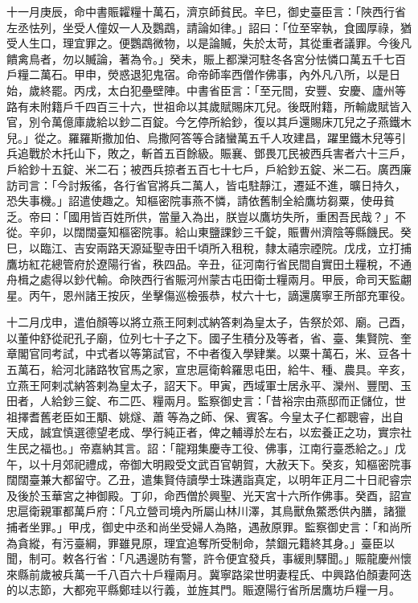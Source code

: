 \begin{pinyinscope}
 十一月庚辰，命中書賑糶糧十萬石，濟京師貧民。辛巳，御史臺臣言：「陜西行省左丞怯列，坐受人僮奴一人及鸚鵡，請論如律。」詔曰：「位至宰執，食國厚祿，猶受人生口，理宜罪之。便鸚鵡微物，以是論贓，失於太苛，其從重者議罪。今後凡饋禽鳥者，勿以贓論，著為令。」癸未，賑上都灤河駐冬各宮分怯憐口萬五千七百戶糧二萬石。甲申，熒惑退犯鬼宿。命帝師率西僧作佛事，內外凡八所，以是日始，歲終罷。丙戌，太白犯壘壁陣。中書省臣言：「至元間，安豐、安慶、廬州等路有未附籍戶千四百三十六，世祖命以其歲賦賜床兀兒。後既附籍，所輸歲賦皆入官，別令萬億庫歲給以鈔二百錠。今乞停所給鈔，復以其戶還賜床兀兒之子燕鐵木兒。」從之。羅羅斯撒加伯、烏撒阿答等合諸蠻萬五千人攻建昌，躍里鐵木兒等引兵追戰於木托山下，敗之，斬首五百餘級。賑襄、鄧畏兀民被西兵害者六十三戶，戶給鈔十五錠、米二石；被西兵掠者五百七十七戶，戶給鈔五錠、米二石。廣西廉訪司言：「今討叛徭，各行省官將兵二萬人，皆屯駐靜江，遷延不進，曠日持久，恐失事機。」詔遣使趣之。知樞密院事燕不憐，請依舊制全給鷹坊芻粟，使毋貧乏。帝曰：「國用皆百姓所供，當量入為出，朕豈以鷹坊失所，重困吾民哉？」不從。辛卯，以闊闊臺知樞密院事。給山東鹽課鈔三千錠，賑曹州濟陰等縣饑民。癸巳，以臨江、吉安兩路天源延聖寺田千頃所入租稅，隸太禧宗禋院。戊戌，立打捕鷹坊紅花總管府於遼陽行省，秩四品。辛丑，征河南行省民間自實田土糧稅，不通舟楫之處得以鈔代輸。命陜西行省賑河州蒙古屯田衛士糧兩月。甲辰，命司天監翽星。丙午，恩州諸王按灰，坐擊傷巡檢張恭，杖六十七，謫還廣寧王所部充軍役。



 十二月戊申，遣伯顏等以將立燕王阿剌忒納答剌為皇太子，告祭於郊、廟。己酉，以董仲舒從祀孔子廟，位列七十子之下。國子生積分及等者，省、臺、集賢院、奎章閣官同考試，中式者以等第試官，不中者復入學肄業。以粟十萬石，米、豆各十五萬石，給河北諸路牧官馬之家，宣忠扈衛斡羅思屯田，給牛、種、農具。辛亥，立燕王阿剌忒納答剌為皇太子，詔天下。甲寅，西域軍士居永平、灤州、豐閏、玉田者，人給鈔三錠、布二匹、糧兩月。監察御史言：「昔裕宗由燕邸而正儲位，世祖擇耆舊老臣如王顒、姚燧、蕭等為之師、保、賓客。今皇太子仁都聰睿，出自天成，誠宜慎選德望老成、學行純正者，俾之輔導於左右，以宏養正之功，實宗社生民之福也。」帝嘉納其言。詔：「龍翔集慶寺工役、佛事，江南行臺悉給之。」戊午，以十月郊祀禮成，帝御大明殿受文武百官朝賀，大赦天下。癸亥，知樞密院事闊闊臺兼大都留守。乙丑，遣集賢侍讀學士珠遘詣真定，以明年正月二十日祀睿宗及後於玉華宮之神御殿。丁卯，命西僧於興聖、光天宮十六所作佛事。癸酉，詔宣忠扈衛親軍都萬戶府：「凡立營司境內所屬山林川澤，其鳥獸魚鱉悉供內膳，諸獵捕者坐罪。」甲戌，御史中丞和尚坐受婦人為賂，遇赦原罪。監察御史言：「和尚所為貪縱，有污臺綱，罪雖見原，理宜追奪所受制命，禁錮元籍終其身。」臺臣以聞，制可。敕各行省：「凡遇邊防有警，許令便宜發兵，事緩則驛聞。」賑龍慶州懷來縣前歲被兵萬一千八百六十戶糧兩月。冀寧路梁世明妻程氏、中興路伯顏妻阿迭的以志節，大都宛平縣鄭珪以行義，並旌其門。賑遼陽行省所居鷹坊戶糧一月。



\end{pinyinscope}